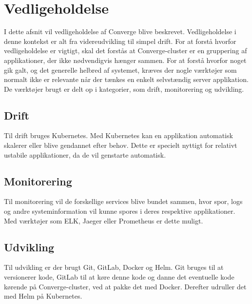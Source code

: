 \chapter{Vedligeholdelse}

I dette afsnit vil vedligeholdelse af Converge blive beskrevet. Vedligeholdelse i denne kontekst er alt fra videreudvikling til simpel drift. For at forstå hvorfor vedligeholdelse er vigtigt, skal det forstås at Converge-cluster er en gruppering af applikationer, der ikke nødvendigvis hænger sammen. For at forstå hvorfor noget gik galt, og det generelle helbred af systemet, kræves der nogle værktøjer som normalt ikke er relevante når der tænkes en enkelt selvstændig server applikation.
De værktøjer brugt er delt op i kategorier, som drift, monitorering og udvikling. 

\section{Drift}
Til drift bruges Kubernetes. Med Kubernetes kan en applikation automatisk skalerer eller blive gendannet efter behov. Dette er specielt nyttigt for relativt ustabile applikationer, da de vil genstarte automatisk. 

\section{Monitorering}
Til monitorering vil de forskellige services blive bundet sammen, hvor spor, logs og andre systeminformation vil kunne spores i deres respektive applikationer. Med værktøjer som ELK, Jaeger eller Prometheus er dette muligt. 

\section{Udvikling}
Til udvikling er der brugt Git, GitLab, Docker og Helm. Git bruges til at versionerer kode, GitLab til at køre denne kode og danne det eventuelle kode kørende på Converge-cluster, ved at pakke det med Docker. Derefter udruller det med Helm på Kubernetes.